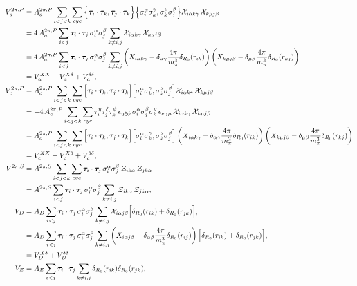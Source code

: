 \documentclass[aps,prc,twocolumn,superscriptaddress,floatfix]{revtex4-1}
\begin{document}
\begin{widetext}
\begin{align}
V_a^{2\pi,P}&=A_a^{2\pi,P}\sum_{i<j<k}\sum_{cyc}\Big\{\bm{\tau}_i\cdot\bm{\tau}_k,\bm{\tau}_j\cdot\bm{\tau}_k\Big\}
\Big\{\sigma_i^\alpha\sigma_k^\gamma,\sigma_k^\mu\sigma_j^\beta\Big\}
{\cal X}_{i\alpha k\gamma}\,{\cal X}_{k\mu j\beta}
\nonumber \\
&=4\,A_a^{2\pi,P}\sum_{i<j}\bm{\tau}_i\cdot\bm{\tau}_j\,\sigma_i^\alpha\sigma_j^\beta
\sum_{k\neq i,j}{\cal X}_{i\alpha k\gamma}\,{\cal X}_{k\mu j\beta} 
\nonumber \\
&=4\,A_a^{2\pi,P}\sum_{i<j}\bm{\tau}_i\cdot\bm{\tau}_j\,\sigma_i^\alpha\sigma_j^\beta
\sum_{k\neq i,j}\left(X_{i\alpha k\gamma}-\delta_{\alpha\gamma}\frac{4\pi}{m_\pi^3}\delta_{R_0}(r_{ik})\right)
\left(X_{k\mu j\beta}-\delta_{\mu\beta}\frac{4\pi}{m_\pi^3}\delta_{R_0}(r_{kj})\right)
\nonumber \\
&=V_a^{XX}+V_a^{X\delta}+V_a^{\delta\delta} ,
\label{eq:anti}
\\
V_c^{2\pi,P}&=A_c^{2\pi,P}\sum_{i<j<k}\sum_{cyc}\Big[\bm{\tau}_i\cdot\bm{\tau}_k,\bm{\tau}_j\cdot\bm{\tau}_k\Big]
\Big[\sigma_i^\alpha\sigma_k^\gamma,\sigma_k^\mu\sigma_j^\beta\Big]
{\cal X}_{i\alpha k\gamma}\,{\cal X}_{k\mu j\beta}
\nonumber \\
&=-4\,A_c^{2\pi,P}\sum_{i<j<k}\sum_{cyc}\tau_i^\eta\tau_j^\xi\tau_k^\phi\,\epsilon_{\eta\xi\phi}\,
\sigma_i^\alpha\sigma_j^\beta\sigma_k^\nu\,\epsilon_{\nu\gamma\mu}\,{\cal X}_{i\alpha k\gamma}\,{\cal X}_{k\mu j\beta} 
\nonumber \\
&=A_c^{2\pi,P}\sum_{i<j<k}\sum_{cyc}\Big[\bm{\tau}_i\cdot\bm{\tau}_k,\bm{\tau}_j\cdot\bm{\tau}_k\Big]
\Big[\sigma_i^\alpha\sigma_k^\gamma,\sigma_k^\mu\sigma_j^\beta\Big]
\left(X_{i\alpha k\gamma}-\delta_{\alpha\gamma}\frac{4\pi}{m_\pi^3}\delta_{R_0}(r_{ik})\right)
\left(X_{k\mu j\beta}-\delta_{\mu\beta}\frac{4\pi}{m_\pi^3}\delta_{R_0}(r_{kj})\right) 
\nonumber \\
&=V_c^{XX}+V_c^{X\delta}+V_c^{\delta\delta} ,
\label{eq:comm}
\\
V^{2\pi,S}&=A^{2\pi,S}\sum_{i<j<k}\sum_{cyc}
\bm{\tau}_i\cdot\bm{\tau}_j\,\sigma_i^\alpha\sigma_j^\beta\,{\cal Z}_{ik\alpha}\,{\cal Z}_{jk\alpha}
\nonumber \\
&=A^{2\pi,S}\sum_{i<j}\bm{\tau}_i\cdot\bm{\tau}_j\,\sigma_i^\alpha\sigma_j^\beta
\sum_{k\neq i,j}{\cal Z}_{ik\alpha}\,{\cal Z}_{jk\alpha} ,
\label{eq:tm}
\\
V_D&=A_D\sum_{i<j}\bm{\tau}_i\cdot\bm{\tau}_j\,\sigma_i^\alpha\sigma_j^\beta
\sum_{k\neq i,j}{\cal X}_{i\alpha j\beta}\Big[\delta_{R_0}(r_{ik})+\delta_{R_0}(r_{jk})\Big] , 
\nonumber \\
&=A_D\sum_{i<j}\bm{\tau}_i\cdot\bm{\tau}_j\,\sigma_i^\alpha\sigma_j^\beta
\sum_{k\neq i,j}\left(X_{i\alpha j\beta}-\delta_{\alpha\beta}\frac{4\pi}{m_\pi^3}\delta_{R_0}(r_{ij})\right) \Big[\delta_{R_0}(r_{ik})+\delta_{R_0}(r_{jk})\Big] , 
\nonumber \\
&=V_D^{X\delta}+V_D^{\delta\delta}
\label{eq:vd}
\\
V_E&=A_E\sum_{i<j}\bm{\tau}_i\cdot\bm{\tau}_j\sum_{k\neq i,j}\delta_{R_0}(r_{ik})\delta_{R_0}(r_{jk}) ,
\label{eq:ve}
\end{align}
\end{widetext}
\end{document}
